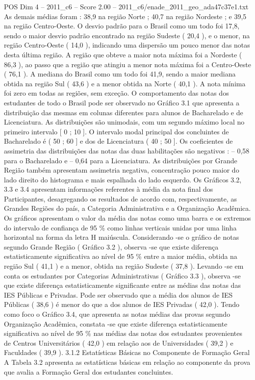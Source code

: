 \begin{textsample}{POS Dim 4 – 2011\_c6 – Score 2.00 – 2011\_c6/enade\_2011\_geo\_ada47c37e1.txt}
As demais médias foram : 38,9 na região Norte ; 40,7 na região Nordeste ; e 39,5 na região Centro-Oeste.
O desvio padrão para o Brasil como um todo foi 17,8, sendo o maior desvio padrão encontrado na região Sudeste ( 20,4 ), e o menor, na região Centro-Oeste ( 14,0 ), indicando uma dispersão um pouco menor das notas desta última região.
A região que obteve a maior nota máxima foi a Nordeste ( 86,3 ), ao passo que a região que atingiu a menor nota máxima foi a Centro-Oeste ( 76,1 ).
A mediana do Brasil como um todo foi 41,9, sendo a maior mediana obtida na região Sul ( 43,6 ) e a menor obtida na Norte ( 40,1 ).
A nota mínima foi zero em todas as regiões, sem exceção.
O comportamento das notas dos estudantes de todo o Brasil pode ser observado no Gráfico 3.1 que apresenta a distribuição das mesmas em colunas diferentes para alunos de Bacharelado e de Licenciatura.
As distribuições são unimodais, com um segundo máximo local no primeiro intervalo [ 0 ; 10 ].
O intervalo modal principal dos concluintes de Bacharelado é ( 50 ; 60 ] e dos de Licenciatura ( 40 ; 50 ].
Os coeficientes de assimetria das distribuições das notas das duas habilitações são negativos : – 0,58 para o Bacharelado e – 0,64 para a Licenciatura.
As distribuições por Grande Região também apresentam assimetria negativa, concentração pouco maior do lado direito do histograma e mais espalhada do lado esquerdo.
Os Gráficos 3.2, 3.3 e 3.4 apresentam informações referentes à média da nota final dos Participantes, desagregando os resultados de acordo com, respectivamente, as Grandes Regiões do país, a Categoria Administrativa e a Organização Acadêmica.
Os gráficos apresentam o valor da média das notas como uma barra e os extremos do intervalo de confiança de 95 \% como linhas verticais unidas por uma linha horizontal na forma da letra H maiúscula.
Considerando -se o gráfico de notas segundo Grande Região ( Gráfico 3.2 ), observa -se que existe diferença estatisticamente significativa ao nível de 95 \% entre a maior média, obtida na região Sul ( 41,1 ) e a menor, obtida na região Sudeste ( 37,8 ).
Levando -se em conta os estudantes por Categorias Administrativas ( Gráfico 3.3 ), observa -se que existe diferença estatisticamente significante entre as médias das notas das IES Públicas e Privadas.
Pode ser observado que a média dos alunos de IES Públicas ( 38,6 ) é menor do que a dos alunos de IES Privadas ( 42,0 ).
Tendo como foco o Gráfico 3.4, que apresenta as notas médias das provas segundo Organização Acadêmica, constata -se que existe diferença estatisticamente significativa ao nível de 95 \% nas médias das notas dos estudantes provenientes de Centros Universitários ( 42,0 ) em relação aos de Universidades ( 39,2 ) e Faculdades ( 39,9 ). 3.1.2 Estatísticas Básicas no Componente de Formação Geral A Tabela 3.2 apresenta as estatísticas básicas em relação ao componente da prova que avalia a Formação Geral dos estudantes concluintes.

\end{textsample}
